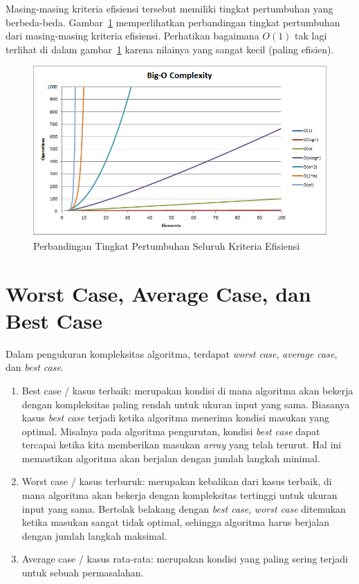 Masing-masing kriteria efisiensi tersebut memiliki tingkat pertumbuhan yang berbeda-beda. Gambar~\ref{fig:allcomplexitycomparison} memperlihatkan perbandingan tingkat pertumbuhan dari masing-masing kriteria efisiensi. Perhatikan bagaimana $O(1)$ tak lagi terlihat di dalam gambar~\ref{fig:allcomplexitycomparison} karena nilainya yang sangat kecil (paling efisien).

\begin{figure}
    \centering
    \includegraphics[width=\textwidth]{fig/AllComplexityComparison}
    \caption{Perbandingan Tingkat Pertumbuhan Seluruh Kriteria Efisiensi}
    \label{fig:allcomplexitycomparison}
\end{figure}

    \FloatBarrier

\section{Worst Case, Average Case, dan Best Case}

Dalam pengukuran kompleksitas algoritma, terdapat \textit{worst case}, \textit{average case}, dan \textit{best case}.

\begin{enumerate}
    \item Best case / kasus terbaik: merupakan kondisi di mana algoritma akan bekerja dengan kompleksitas paling rendah untuk ukuran input yang sama. Biasanya kasus \textit{best case} terjadi ketika algoritma menerima kondisi masukan yang optimal. Misalnya pada algoritma pengurutan, kondisi \textit{best case} dapat tercapai ketika kita memberikan masukan \textit{array} yang telah terurut. Hal ini memastikan algoritma akan berjalan dengan jumlah langkah minimal.
    \item Worst case / kasus terburuk: merupakan kebalikan dari kasus terbaik, di mana algoritma akan bekerja dengan kompleksitas tertinggi untuk ukuran input yang sama. Bertolak belakang dengan \textit{best case}, \textit{worst case} ditemukan ketika masukan sangat tidak optimal, sehingga algoritma harus berjalan dengan jumlah langkah maksimal.
    \item Average case / kasus rata-rata: merupakan kondisi yang paling sering terjadi untuk sebuah permasalahan.
\end{enumerate}

